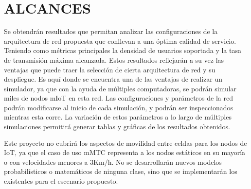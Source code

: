 
\section{ALCANCES}

Se obtendrán resultados que permitan analizar las configuraciones de la arquitectura de red propuesta que conllevan a una óptima calidad de servicio. Teniendo como métricas principales la densidad de usuarios soportada y la tasa de transmisión máxima alcanzada. Estos resultados reflejarán a su vez las ventajas que puede traer la selección de cierta arquitectura de red y su despliegue. Es aquí donde se encuentra una de las ventajas de realizar un simulador, ya que con la ayuda de múltiples computadoras, se podrán simular miles de nodos mIoT en esta red. Las configuraciones y parámetros de la red podrán modificarse al inicio de cada simulación, y podrán ser inspeccionados mientras esta corre. La variación de estos parámetros a lo largo de múltiples simulaciones permitirá generar tablas y gráficas de los resultados obtenidos.\newline

Este proyecto no cubrirá los aspectos de movilidad entre celdas para los nodos de IoT, ya que el caso de uso mMTC representa a los nodos estáticos en su mayoría o con velocidades menores a 3Km/h.  No se desarrollarán nuevos modelos probabilísticos o matemáticos de ninguna clase, sino que se implementarán los existentes para el escenario propuesto.\newline
